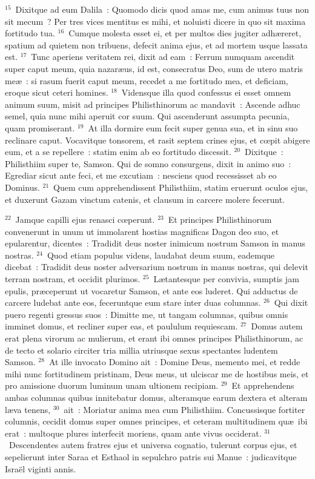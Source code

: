 ${}^{15}$~Dixitque ad eum Dalila~: Quomodo dicis quod amas me, cum animus tuus non sit mecum~? Per tres vices mentitus es mihi, et noluisti dicere in quo sit maxima fortitudo tua.
${}^{16}$~Cumque molesta esset ei, et per multos dies jugiter adh\ae reret, spatium ad quietem non tribuens, defecit anima ejus, et ad mortem usque lassata est.
${}^{17}$~Tunc aperiens veritatem rei, dixit ad eam~: Ferrum numquam ascendit super caput meum, quia nazar\ae us, id est, consecratus Deo, sum de utero matris me\ae~: si rasum fuerit caput meum, recedet a me fortitudo mea, et deficiam, eroque sicut ceteri homines.
${}^{18}$~Vidensque illa quod confessus ei esset omnem animum suum, misit ad principes Philisthinorum ac mandavit~: Ascende adhuc semel, quia nunc mihi aperuit cor suum. Qui ascenderunt assumpta pecunia, quam promiserant.
${}^{19}$~At illa dormire eum fecit super genua sua, et in sinu suo reclinare caput. Vocavitque tonsorem, et rasit septem crines ejus, et cœpit abigere eum, et a se repellere~: statim enim ab eo fortitudo discessit.
${}^{20}$~Dixitque~: Philisthiim super te, Samson. Qui de somno consurgens, dixit in animo suo~: Egrediar sicut ante feci, et me excutiam~: nesciens quod recessisset ab eo Dominus.
${}^{21}$~Quem cum apprehendissent Philisthiim, statim eruerunt oculos ejus, et duxerunt Gazam vinctum catenis, et clausum in carcere molere fecerunt.


${}^{22}$~Jamque capilli ejus renasci cœperunt.
${}^{23}$~Et principes Philisthinorum convenerunt in unum ut immolarent hostias magnificas Dagon deo suo, et epularentur, dicentes~: Tradidit deus noster inimicum nostrum Samson in manus nostras.
${}^{24}$~Quod etiam populus videns, laudabat deum suum, eademque dicebat~: Tradidit deus noster adversarium nostrum in manus nostras, qui delevit terram nostram, et occidit plurimos.
${}^{25}$~L\ae tantesque per convivia, sumptis jam epulis, pr\ae ceperunt ut vocaretur Samson, et ante eos luderet. Qui adductus de carcere ludebat ante eos, feceruntque eum stare inter duas columnas.
${}^{26}$~Qui dixit puero regenti gressus suos~: Dimitte me, ut tangam columnas, quibus omnis imminet domus, et recliner super eas, et paululum requiescam.
${}^{27}$~Domus autem erat plena virorum ac mulierum, et erant ibi omnes principes Philisthinorum, ac de tecto et solario circiter tria millia utriusque sexus spectantes ludentem Samson.
${}^{28}$~At ille invocato Domino ait~: Domine Deus, memento mei, et redde mihi nunc fortitudinem pristinam, Deus meus, ut ulciscar me de hostibus meis, et pro amissione duorum luminum unam ultionem recipiam.
${}^{29}$~Et apprehendens ambas columnas quibus innitebatur domus, alteramque earum dextera et alteram l\ae va tenens,
${}^{30}$~ait~: Moriatur anima mea cum Philisthiim. Concussisque fortiter columnis, cecidit domus super omnes principes, et ceteram multitudinem qu\ae\ ibi erat~: multoque plures interfecit moriens, quam ante vivus occiderat.
${}^{31}$~Descendentes autem fratres ejus et universa cognatio, tulerunt corpus ejus, et sepelierunt inter Saraa et Esthaol in sepulchro patris sui Manue~: judicavitque Isra\"el viginti annis.

